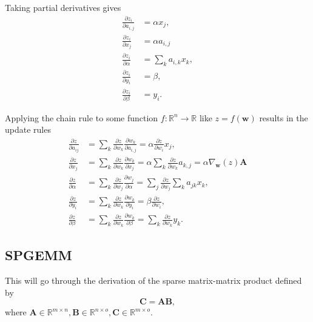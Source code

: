 \documentclass{article}
\newcommand{\mat}[1]{\bm{{#1}}}
\renewcommand{\vec}[1]{\bm{{#1}}}
\newcommand{\grad}{\nabla}
\theoremstyle{definition}
\begin{document}
Taking partial derivatives gives
\begin{align}
  \frac{\partial z_i}{\partial a_{i,j}} &= \alpha x_j, \\
  \frac{\partial z_i}{\partial x_j} &= \alpha a_{i, j} \\
  \frac{\partial z_i}{\partial \alpha} &= \sum_k a_{i,k} x_k, \\
  \frac{\partial z_i}{\partial y_i} &= \beta, \\
  \frac{\partial z_i}{\partial \beta} &= y_i.
\end{align}

Applying the chain rule to some function $f : \mathbb{R}^n \to \mathbb{R}$ like $z=f\left(\vec{w}\right)$ results in the update rules
\begin{align}
  \frac{\partial z}{\partial a_{ij}} &= \sum_k \frac{\partial z}{\partial w_k} \frac{\partial w_k}{\partial a_{i,j}} = \alpha \frac{\partial z}{\partial w_i} x_j, \\
  \frac{\partial z}{\partial x_j} &= \sum_k \frac{\partial z}{\partial w_k} \frac{\partial w_k}{\partial x_j} = \alpha \sum_k \frac{\partial z}{\partial w_k} a_{k, j} = \alpha \grad_{\vec{w}}\left(z\right) \mat{A} \\
  \frac{\partial z}{\partial \alpha} &= \sum_k \frac{\partial z}{\partial w_j} \frac{\partial w_j}{\partial \alpha} = \sum_j \frac{\partial z}{\partial w_j} \sum_k a_{jk} x_k, \\
  \frac{\partial z}{\partial y_i} &= \sum_k \frac{\partial z}{\partial w_k} \frac{\partial w_k}{\partial y_i} = \beta \frac{\partial z}{\partial w_i}, \\
  \frac{\partial z}{\partial \beta} &= \sum_k \frac{\partial z}{\partial w_k} \frac{\partial w_k}{\partial \beta} = \sum_k \frac{\partial z}{\partial w_k} y_k.
\end{align}

\subsection{SPGEMM}
This will go through the derivation of the sparse matrix-matrix product defined by
\begin{equation}
  \mat{C} = \mat{A}\mat{B},
\end{equation}
where $\mat{A} \in \mathbb{R}^{m \times n}, \mat{B} \in \mathbb{R}^{n \times o}, \mat{C} \in \mathbb{R}^{m \times o}$.
\end{document}
